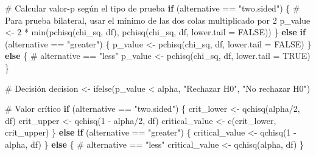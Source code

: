 \documentclass[
  spanish,
  letterpaper,
]{book}
\newenvironment{Shaded}{\begin{snugshade}}{\end{snugshade}}
\newcommand{\AttributeTok}[1]{\textcolor[rgb]{0.40,0.45,0.13}{#1}}
\newcommand{\CommentTok}[1]{\textcolor[rgb]{0.37,0.37,0.37}{#1}}
\newcommand{\ConstantTok}[1]{\textcolor[rgb]{0.56,0.35,0.01}{#1}}
\newcommand{\ControlFlowTok}[1]{\textcolor[rgb]{0.00,0.23,0.31}{\textbf{#1}}}
\newcommand{\DecValTok}[1]{\textcolor[rgb]{0.68,0.00,0.00}{#1}}
\newcommand{\FunctionTok}[1]{\textcolor[rgb]{0.28,0.35,0.67}{#1}}
\newcommand{\NormalTok}[1]{\textcolor[rgb]{0.00,0.23,0.31}{#1}}
\newcommand{\OtherTok}[1]{\textcolor[rgb]{0.00,0.23,0.31}{#1}}
\newcommand{\SpecialCharTok}[1]{\textcolor[rgb]{0.37,0.37,0.37}{#1}}
\newcommand{\StringTok}[1]{\textcolor[rgb]{0.13,0.47,0.30}{#1}}
\begin{document}
\begin{Shaded}
\begin{Highlighting}[]
  \CommentTok{\# Calcular valor{-}p según el tipo de prueba}
  \ControlFlowTok{if}\NormalTok{ (alternative }\SpecialCharTok{==} \StringTok{"two.sided"}\NormalTok{) \{}
    \CommentTok{\# Para prueba bilateral, usar el mínimo de las dos colas multiplicado por 2}
\NormalTok{    p\_value }\OtherTok{\textless{}{-}} \DecValTok{2} \SpecialCharTok{*} \FunctionTok{min}\NormalTok{(}\FunctionTok{pchisq}\NormalTok{(chi\_sq, df), }\FunctionTok{pchisq}\NormalTok{(chi\_sq, df, }\AttributeTok{lower.tail =} \ConstantTok{FALSE}\NormalTok{))}
\NormalTok{  \} }\ControlFlowTok{else} \ControlFlowTok{if}\NormalTok{ (alternative }\SpecialCharTok{==} \StringTok{"greater"}\NormalTok{) \{}
\NormalTok{    p\_value }\OtherTok{\textless{}{-}} \FunctionTok{pchisq}\NormalTok{(chi\_sq, df, }\AttributeTok{lower.tail =} \ConstantTok{FALSE}\NormalTok{)}
\NormalTok{  \} }\ControlFlowTok{else}\NormalTok{ \{ }\CommentTok{\# alternative == "less"}
\NormalTok{    p\_value }\OtherTok{\textless{}{-}} \FunctionTok{pchisq}\NormalTok{(chi\_sq, df, }\AttributeTok{lower.tail =} \ConstantTok{TRUE}\NormalTok{)}
\NormalTok{  \}}
  
  \CommentTok{\# Decisión}
\NormalTok{  decision }\OtherTok{\textless{}{-}} \FunctionTok{ifelse}\NormalTok{(p\_value }\SpecialCharTok{\textless{}}\NormalTok{ alpha, }\StringTok{"Rechazar H0"}\NormalTok{, }\StringTok{"No rechazar H0"}\NormalTok{)}
  
  \CommentTok{\# Valor crítico}
  \ControlFlowTok{if}\NormalTok{ (alternative }\SpecialCharTok{==} \StringTok{"two.sided"}\NormalTok{) \{}
\NormalTok{    crit\_lower }\OtherTok{\textless{}{-}} \FunctionTok{qchisq}\NormalTok{(alpha}\SpecialCharTok{/}\DecValTok{2}\NormalTok{, df)}
\NormalTok{    crit\_upper }\OtherTok{\textless{}{-}} \FunctionTok{qchisq}\NormalTok{(}\DecValTok{1} \SpecialCharTok{{-}}\NormalTok{ alpha}\SpecialCharTok{/}\DecValTok{2}\NormalTok{, df)}
\NormalTok{    critical\_value }\OtherTok{\textless{}{-}} \FunctionTok{c}\NormalTok{(crit\_lower, crit\_upper)}
\NormalTok{  \} }\ControlFlowTok{else} \ControlFlowTok{if}\NormalTok{ (alternative }\SpecialCharTok{==} \StringTok{"greater"}\NormalTok{) \{}
\NormalTok{    critical\_value }\OtherTok{\textless{}{-}} \FunctionTok{qchisq}\NormalTok{(}\DecValTok{1} \SpecialCharTok{{-}}\NormalTok{ alpha, df)}
\NormalTok{  \} }\ControlFlowTok{else}\NormalTok{ \{ }\CommentTok{\# alternative == "less"}
\NormalTok{    critical\_value }\OtherTok{\textless{}{-}} \FunctionTok{qchisq}\NormalTok{(alpha, df)}
\NormalTok{  \}}
  

\end{Highlighting}
\end{Shaded}
\end{document}
